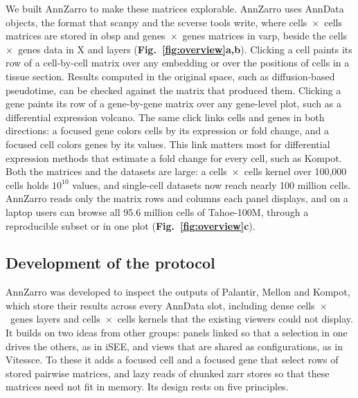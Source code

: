 We built AnnZarro to make these matrices explorable. AnnZarro uses AnnData objects\cite{virshup2024anndata}, the format that scanpy and the scverse tools write, where cells~$\times$~cells matrices are stored in obsp and genes~$\times$~genes matrices in varp, beside the cells~$\times$~genes data in X and layers (\textbf{Fig.~\ref{fig:overview}a,b}). Clicking a cell paints its row of a cell-by-cell matrix over any embedding or over the positions of cells in a tissue section. Results computed in the original space, such as diffusion-based pseudotime, can be checked against the matrix that produced them. Clicking a gene paints its row of a gene-by-gene matrix over any gene-level plot, such as a differential expression volcano. The same click links cells and genes in both directions: a focused gene colors cells by its expression or fold change, and a focused cell colors genes by its values. This link matters most for differential expression methods that estimate a fold change for every cell, such as Kompot\cite{otto2025kompot}. Both the matrices and the datasets are large: a cells~$\times$~cells kernel over 100,000 cells holds $10^{10}$ values, and single-cell datasets now reach nearly 100 million cells\cite{zhang2025tahoe}. AnnZarro reads only the matrix rows and columns each panel displays, and on a laptop users can browse all 95.6 million cells of Tahoe-100M, through a reproducible subset or in one plot (\textbf{Fig.~\ref{fig:overview}c}).



\subsection{Development of the protocol}

AnnZarro was developed to inspect the outputs of Palantir\cite{setty2019}, Mellon\cite{otto2024mellon} and Kompot\cite{otto2025kompot}, which store their results across every AnnData slot, including dense cells~$\times$~genes layers and cells~$\times$~cells kernels that the existing viewers could not display. It builds on two ideas from other groups: panels linked so that a selection in one drives the others, as in iSEE\cite{ruealbrecht2018}, and views that are shared as configurations, as in Vitessce\cite{keller2025}. To these it adds a focused cell and a focused gene that select rows of stored pairwise matrices, and lazy reads of chunked zarr stores so that these matrices need not fit in memory. Its design rests on five principles.

